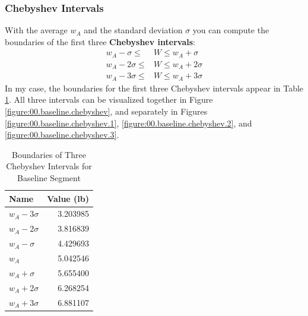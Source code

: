 \subsubsection{Chebyshev Intervals}
With the average $w_{A}$ and the standard deviation $\sigma$ you can compute the boundaries of the first three \textbf{Chebyshev intervals}:
\begin{align}
    w_{A} - \sigma \leq {}&W \leq w_{A} + \sigma \\
    w_{A} - 2\sigma \leq {}&W \leq w_{A} + 2\sigma \\
    w_{A} - 3\sigma \leq {}&W \leq w_{A} + 3\sigma
\end{align}
In my case, the boundaries for the first three Chebyshev intervals appear in Table \ref{table:00.baseline.chebyshev}. All three intervals can be visualized together in Figure \ref{figure:00.baseline.chebyshev}, and separately in Figures \ref{figure:00.baseline.chebyshev.1}, \ref{figure:00.baseline.chebyshev.2}, and \ref{figure:00.baseline.chebyshev.3}.
\begin{table}
    \centering
    \begin{tabular}{|l|r|}
        \hline
        \textbf{Name} & \textbf{Value (lb)} \\
        \hline
        $w_{A} - 3 \sigma$ & 3.203985 \\
        $w_{A} - 2 \sigma$ & 3.816839 \\
        $w_{A} - \sigma$ & 4.429693 \\
        \hline
        $w_{A}$ & 5.042546 \\
        \hline
        $w_{A} + \sigma$ & 5.655400 \\
        $w_{A} + 2 \sigma$ & 6.268254 \\
        $w_{A} + 3 \sigma$ & 6.881107 \\
        \hline
    \end{tabular}
    \caption{Boundaries of Three Chebyshev Intervals for Baseline Segment}
    \label{table:00.baseline.chebyshev}
\end{table}
